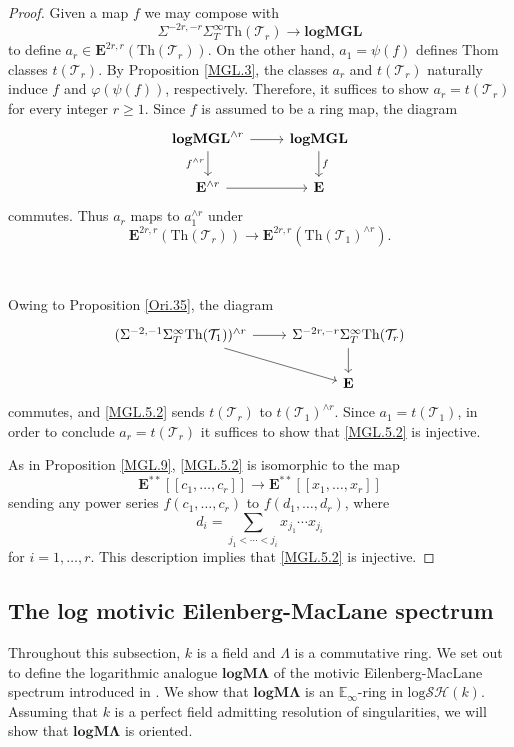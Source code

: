 \documentclass[11pt, a4paper]{amsart}
\theoremstyle{definition}
\numberwithin{equation}{subsection}
\newcommand{\E}{\mathbb{E}}
\newcommand{\Thom}{\mathrm{Th}}
\newcommand{\spectlogMGL}{{\mathbf{logMGL}}}
\newcommand{\spectlogML}{\mathbf{logM\Lambda}}
\newcommand{\cT}{\mathcal{T}}
\newcommand{\ringE}{\mathbf{E}}
\newcommand{\inflogSH}{\mathrm{log}\mathcal{SH}}
\begin{document}
\begin{proof}
Given a map $f$ we may compose with
\[
\Sigma^{-2r,-r}\Sigma_T^\infty \Thom(\cT_r)\to \spectlogMGL
\]
to define $a_r\in \ringE^{2r,r}(\Thom(\cT_r))$.
On the other hand, $a_1=\psi(f)$ defines Thom classes $t(\cT_r)$.
By Proposition \ref{MGL.3},
the classes $a_r$ and $t(\cT_r)$ naturally induce $f$ and $\varphi(\psi(f))$, 
respectively.
Therefore, it suffices to show $a_r=t(\cT_r)$ for every integer $r\geq 1$.
Since $f$ is assumed to be a ring map, the diagram
\[
\begin{tikzcd}
\spectlogMGL^{\wedge r}\ar[r]\ar[d,"f^{\wedge r}"']&
\spectlogMGL\ar[d,"f"]
\\
\ringE^{\wedge r}\ar[r]&
\ringE
\end{tikzcd}
\]
commutes.
Thus $a_r$ maps to $a_1^{\wedge r}$ under 
\begin{equation}
\label{MGL.5.2}
\ringE^{2r,r}(\Thom(\cT_r))
\to
\ringE^{2r,r}(\Thom(\cT_1)^{\wedge r}).
\end{equation}

\

Owing to Proposition \ref{Ori.35}, the diagram
\[
\begin{tikzcd}
(\Sigma^{-2,-1}\Sigma_T^\infty \Thom(\cT_1))^{\wedge r}\ar[r]\ar[rd]&
\Sigma^{-2r,-r}\Sigma_T^\infty \Thom(\cT_r)\ar[d]
\\
&
\ringE
\end{tikzcd}
\]
commutes, and \eqref{MGL.5.2} sends $t(\cT_r)$ to $t(\cT_1)^{\wedge r}$.
Since $a_1=t(\cT_1)$, 
in order to conclude $a_r=t(\cT_r)$ it suffices to show that \eqref{MGL.5.2} is injective.

As in Proposition \ref{MGL.9}, \eqref{MGL.5.2} is isomorphic to the map
\[
\ringE^{**}[[c_1,\ldots,c_r]]
\to
\ringE^{**}[[x_1,\ldots,x_r]]
\]
sending any power series $f(c_1,\ldots,c_r)$ to $f(d_1,\ldots,d_r)$, where
\[
d_i=\sum_{j_1< \cdots < j_i}x_{j_1}\cdots x_{j_i}
\]
for $i=1,\ldots,r$.
This description implies that \eqref{MGL.5.2} is injective.
\end{proof}




\subsection{The log motivic Eilenberg-MacLane spectrum}

Throughout this subsection, $k$ is a field and $\Lambda$ is a commutative ring.
We set out to define the logarithmic analogue $\spectlogML$ of the motivic Eilenberg-MacLane spectrum 
introduced in \cite{zbMATH01194164}.
We show that $\spectlogML$ is an $\E_\infty$-ring in $\inflogSH(k)$.
Assuming that $k$ is a perfect field admitting resolution of singularities, 
we will show that $\spectlogML$ is oriented.
\end{document}
